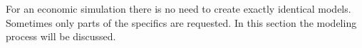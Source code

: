 For an economic simulation there is no need to create exactly identical models.  Sometimes only parts of the specifics are requested. In this section the modeling process will be discussed. 